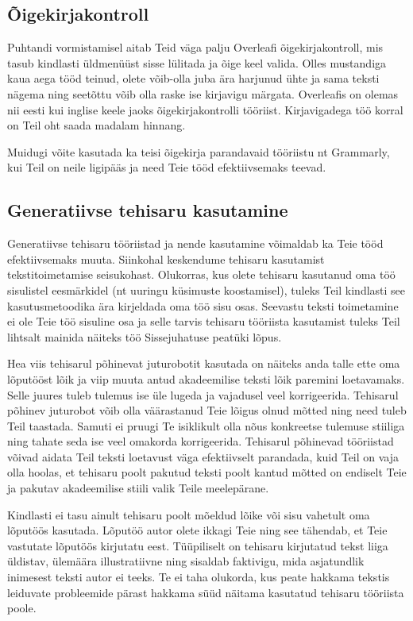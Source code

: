 \subsection{Õigekirjakontroll}
Puhtandi vormistamisel aitab Teid väga palju Overleafi õigekirjakontroll, mis tasub kindlasti üldmenüüst sisse lülitada ja õige keel valida. Olles mustandiga kaua aega tööd teinud, olete võib-olla juba ära harjunud ühte ja sama teksti nägema ning seetõttu võib olla raske ise kirjavigu märgata. Overleafis on olemas nii eesti kui inglise keele jaoks õigekirjakontrolli tööriist. Kirjavigadega töö korral on Teil oht saada madalam hinnang.

Muidugi võite kasutada ka teisi õigekirja parandavaid tööriistu nt Grammarly, kui Teil on neile ligipääs ja need Teie tööd efektiivsemaks teevad.

\subsection{Generatiivse tehisaru kasutamine}
Generatiivse tehisaru tööriistad ja nende kasutamine võimaldab ka Teie tööd efektiivsemaks muuta. Siinkohal keskendume tehisaru kasutamist tekstitoimetamise seisukohast. Olukorras, kus olete tehisaru kasutanud oma töö sisulistel eesmärkidel (nt uuringu küsimuste koostamisel), tuleks Teil kindlasti see kasutusmetoodika ära kirjeldada oma töö sisu osas. Seevastu teksti toimetamine ei ole Teie töö sisuline osa ja selle tarvis tehisaru tööriista kasutamist tuleks Teil lihtsalt mainida näiteks töö Sissejuhatuse peatüki lõpus.

Hea viis tehisarul põhinevat juturobotit kasutada on näiteks anda talle ette oma lõputööst lõik ja viip muuta antud akadeemilise teksti lõik paremini loetavamaks. Selle juures tuleb tulemus ise üle lugeda ja vajadusel veel korrigeerida. Tehisarul põhinev juturobot võib olla väärastanud Teie lõigus olnud mõtted ning need tuleb Teil taastada. Samuti ei pruugi Te isiklikult olla nõus konkreetse tulemuse stiiliga ning tahate seda ise veel omakorda korrigeerida. Tehisarul põhinevad tööriistad võivad aidata Teil teksti loetavust väga efektiivselt parandada, kuid Teil on vaja olla hoolas, et tehisaru poolt pakutud teksti poolt kantud mõtted on endiselt Teie ja pakutav akadeemilise stiili valik Teile meelepärane.

Kindlasti ei tasu ainult tehisaru poolt mõeldud lõike või sisu vahetult oma lõputöös kasutada. Lõputöö autor olete ikkagi Teie ning see tähendab, et Teie vastutate lõputöös kirjutatu eest. Tüüpiliselt on tehisaru kirjutatud tekst liiga üldistav, ülemäära illustratiivne ning sisaldab faktivigu, mida asjatundlik inimesest teksti autor ei teeks. Te ei taha olukorda, kus peate hakkama tekstis leiduvate probleemide pärast hakkama süüd näitama kasutatud tehisaru tööriista poole.
